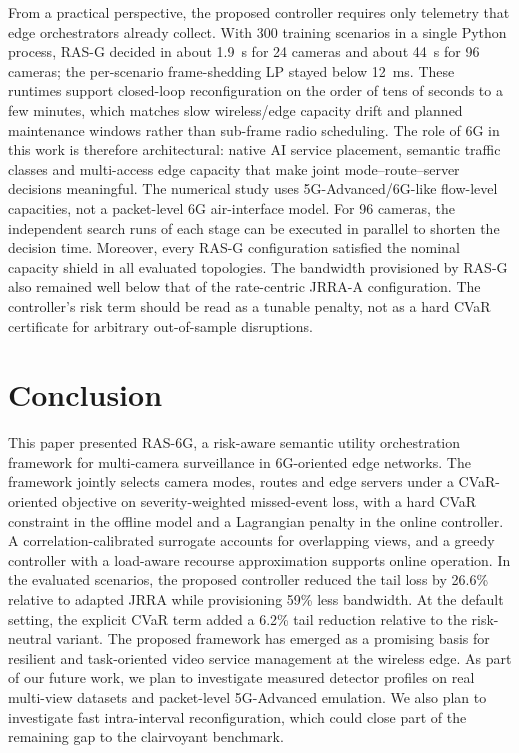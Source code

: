 \documentclass[letterpaper,journal]{IEEEtran}
\begin{document}
From a practical perspective, the proposed controller requires only telemetry that edge orchestrators already collect. With 300 training scenarios in a single Python process, RAS-G decided in about 1.9~s for 24 cameras and about 44~s for 96 cameras; the per-scenario frame-shedding LP stayed below 12~ms. These runtimes support closed-loop reconfiguration on the order of tens of seconds to a few minutes, which matches slow wireless/edge capacity drift and planned maintenance windows rather than sub-frame radio scheduling. The role of 6G in this work is therefore architectural: native AI service placement, semantic traffic classes and multi-access edge capacity that make joint mode--route--server decisions meaningful. The numerical study uses 5G-Advanced/6G-like flow-level capacities, not a packet-level 6G air-interface model. For 96 cameras, the independent search runs of each stage can be executed in parallel to shorten the decision time. Moreover, every RAS-G configuration satisfied the nominal capacity shield in all evaluated topologies. The bandwidth provisioned by RAS-G also remained well below that of the rate-centric JRRA-A configuration. The controller's risk term should be read as a tunable penalty, not as a hard CVaR certificate for arbitrary out-of-sample disruptions.

\section{Conclusion}
This paper presented RAS-6G, a risk-aware semantic utility orchestration framework for multi-camera surveillance in 6G-oriented edge networks. The framework jointly selects camera modes, routes and edge servers under a CVaR-oriented objective on severity-weighted missed-event loss, with a hard CVaR constraint in the offline model and a Lagrangian penalty in the online controller. A correlation-calibrated surrogate accounts for overlapping views, and a greedy controller with a load-aware recourse approximation supports online operation. In the evaluated scenarios, the proposed controller reduced the tail loss by 26.6\% relative to adapted JRRA while provisioning 59\% less bandwidth. At the default setting, the explicit CVaR term added a 6.2\% tail reduction relative to the risk-neutral variant. The proposed framework has emerged as a promising basis for resilient and task-oriented video service management at the wireless edge. As part of our future work, we plan to investigate measured detector profiles on real multi-view datasets and packet-level 5G-Advanced emulation. We also plan to investigate fast intra-interval reconfiguration, which could close part of the remaining gap to the clairvoyant benchmark.
\end{document}
